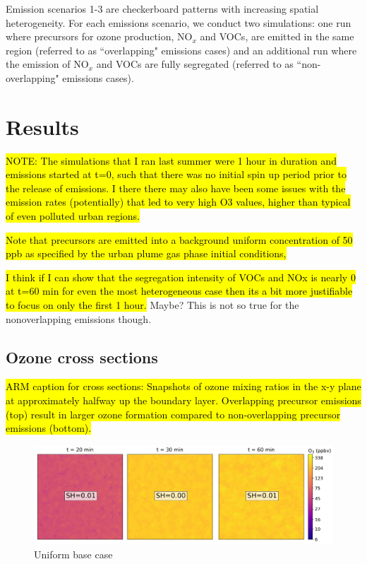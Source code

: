 Emission scenarios 1-3 are checkerboard patterns with increasing spatial heterogeneity. For each emissions scenario, we conduct two simulations: one run where precursors for ozone production, NO$_x$ and VOCs, are emitted in the same region (referred to as ``overlapping" emissions cases) and an additional run where the emission of NO$_x$ and VOCs are fully segregated (referred to as ``non-overlapping" emissions cases).

\section{Results}

\hl{NOTE: The simulations that I ran last summer were 1 hour in duration and emissions started at t=0, such that there was no initial spin up period prior to the release of emissions. I there there may also have been some issues with the emission rates (potentially) that led to very high O3 values, higher than typical of even polluted urban regions.}

\hl{Note that precursors are emitted into a background uniform concentration of 50 ppb as specified by the urban plume gas phase initial conditions,}

\hl{I think if I can show that the segregation intensity of VOCs and NOx is nearly 0 at t=60 min for even the most heterogeneous case then its a bit more justifiable to focus on only the first 1 hour.} Maybe? This is not so true for the nonoverlapping emissions though.

\subsection{Ozone cross sections}

\hl{ARM caption for cross sections: Snapshots of ozone mixing ratios in the x-y plane at approximately halfway up the boundary layer. Overlapping precursor emissions (top) result in larger ozone formation compared to non-overlapping precursor emissions (bottom).}

\begin{figure}[h]
    \centering
    \includegraphics[width=\textwidth]{figures/ozone_cross_section_basecase_overlapTrue.png}
    \caption{Uniform base case}
  \end{figure}

